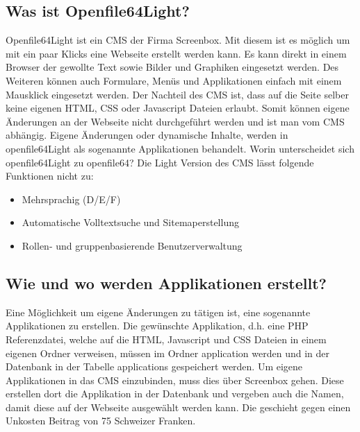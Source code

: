 \documentclass[a4paper,ngerman, 11pt, pagesize]{report}
\begin{document}
  
\subsection{Was ist Openfile64Light?}
Openfile64Light ist ein CMS der Firma Screenbox. Mit diesem ist es möglich um mit ein paar Klicks eine Webseite erstellt werden kann. Es kann direkt in einem Browser der gewollte Text sowie Bilder und Graphiken eingesetzt werden. Des Weiteren können auch Formulare, Menüs und Applikationen einfach mit einem Mausklick eingesetzt werden. Der Nachteil des CMS ist, dass auf die Seite selber keine eigenen HTML, CSS oder Javascript Dateien erlaubt. Somit können eigene Änderungen an der Webseite nicht durchgeführt werden und ist man vom CMS abhängig. Eigene Änderungen oder dynamische Inhalte, werden in openfile64Light als sogenannte Applikationen behandelt. Worin unterscheidet sich openfile64Light zu openfile64? Die Light Version des CMS lässt folgende Funktionen nicht zu:
\begin{itemize}
\item Mehrsprachig (D/E/F)
\item Automatische Volltextsuche und Sitemaperstellung
\item Rollen- und gruppenbasierende Benutzerverwaltung
\end{itemize}


\subsection{Wie und wo werden Applikationen erstellt?}
Eine Möglichkeit um eigene Änderungen zu tätigen ist, eine sogenannte Applikationen zu erstellen. Die gewünschte Applikation, d.h. eine PHP Referenzdatei, welche auf die HTML, Javascript und CSS Dateien in einem eigenen Ordner verweisen, müssen im Ordner application werden und in der Datenbank in der Tabelle applications gespeichert werden. Um eigene Applikationen in das CMS einzubinden, muss dies über Screenbox gehen. Diese erstellen dort die Applikation in der Datenbank und vergeben auch die Namen, damit diese auf der Webseite ausgewählt werden kann. Die geschieht gegen einen Unkosten Beitrag von 75 Schweizer Franken.
\end{document}
